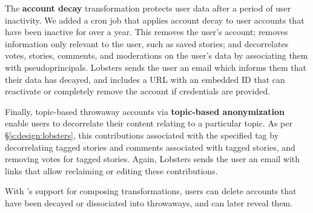 The \textbf{account decay} transformation protects
user data after a period of user inactivity.
%
We added a cron job that applies account decay to
user accounts that have been inactive for over a year.
%
This
\one{} removes the user's account;
\two{} removes information only relevant to the user, such as saved stories;
\three{} and decorrelates votes, stories, comments, and moderations on the
user's data by associating them with pseudoprincipals.
%
%
%
%
Lobsters sends the user an email which informs them that their data has
decayed, and includes a URL with an embedded \xx ID that can reactivate or
completely remove the account if credentials are provided.
%

Finally, topic-based throwaway accounts via \textbf{topic-based
anonymization}
enable users to decorrelate their content relating to a particular topic.
%
As per \S\ref{s:design:lobsters}, this \xxs contributions associated with the
specified tag by \one{} decorrelating tagged stories and comments associated with
tagged stories, and \two{} removing votes for tagged stories.
%
Again, Lobsters sends the user an email with links that allow reclaiming or
editing these contributions.
%

%
With \sys's support for composing \xxing transformations, users can
delete accounts that have been decayed or dissociated into throwaways, and
can later reveal them.

%

